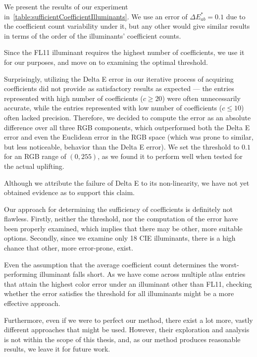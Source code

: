 We present the results of our experiment in~\cref{table:sufficientCoefficientIlluminants}. We use an error of $\Delta E_{ab}^*=0.1$ due to the coefficient count variability under it, but any other would give similar results in terms of the order of the illuminants' coefficient counts.

Since the FL11 illuminant requires the highest number of coefficients, we use it for our purposes, and move on to examining the optimal threshold.

Surprisingly, utilizing the Delta E error in our iterative process of acquiring coefficients did not provide as satisfactory results as expected --- the entries represented with high number of coefficients ($c \ge 20$) were often unnecessarily accurate, while the entries represented with low number of coefficients ($c \le 10$) often lacked precision. Therefore, we decided to compute the error as an  absolute difference over all three RGB components, which outperformed both the Delta E error and even the Euclidean error in the RGB space (which was prone to similar, but less noticeable, behavior than the Delta E error). We set the threshold to $0.1$ for an RGB range of $(0,255)$, as we found it to perform well when tested for the actual uplifting. 

Although we attribute the failure of Delta E to its non-linearity, we have not yet obtained evidence as to support this claim.

Our approach for determining the sufficiency of coefficients is definitely not flawless. Firstly, neither the threshold, nor the computation of the error have been properly examined, which implies that there may be other, more suitable options. Secondly, since we examine only 18 CIE illuminants, there is a high chance that other, more error-prone, exist.

Even the assumption that the average coefficient count determines the worst-performing illuminant falls short. As we have come across multiple atlas entries that attain the highest color error under an illuminant other than FL11, checking whether the error satisfies the threshold for all illuminants might be a more effective approach.

Furthermore, even if we were to perfect our method, there exist a lot more, vastly different approaches that might be used. However, their exploration and analysis is not within the scope of this thesis, and, as our method produces reasonable results, we leave it for future work.

